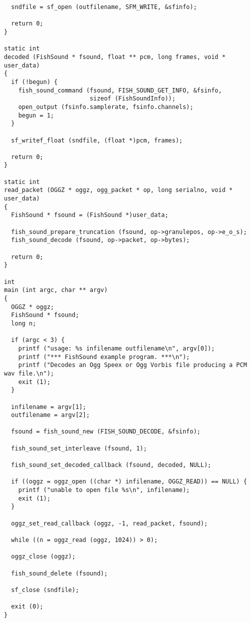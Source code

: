 \begin{verbatim}
  sndfile = sf_open (outfilename, SFM_WRITE, &sfinfo);

  return 0;
}

static int
decoded (FishSound * fsound, float ** pcm, long frames, void * user_data)
{
  if (!begun) {
    fish_sound_command (fsound, FISH_SOUND_GET_INFO, &fsinfo,
                        sizeof (FishSoundInfo));
    open_output (fsinfo.samplerate, fsinfo.channels);
    begun = 1;
  }

  sf_writef_float (sndfile, (float *)pcm, frames);

  return 0;
}

static int
read_packet (OGGZ * oggz, ogg_packet * op, long serialno, void * user_data)
{
  FishSound * fsound = (FishSound *)user_data;

  fish_sound_prepare_truncation (fsound, op->granulepos, op->e_o_s);
  fish_sound_decode (fsound, op->packet, op->bytes);

  return 0;
}

int
main (int argc, char ** argv)
{
  OGGZ * oggz;
  FishSound * fsound;
  long n;

  if (argc < 3) {
    printf ("usage: %s infilename outfilename\n", argv[0]);
    printf ("*** FishSound example program. ***\n");
    printf ("Decodes an Ogg Speex or Ogg Vorbis file producing a PCM wav file.\n");
    exit (1);
  }

  infilename = argv[1];
  outfilename = argv[2];

  fsound = fish_sound_new (FISH_SOUND_DECODE, &fsinfo);

  fish_sound_set_interleave (fsound, 1);

  fish_sound_set_decoded_callback (fsound, decoded, NULL);

  if ((oggz = oggz_open ((char *) infilename, OGGZ_READ)) == NULL) {
    printf ("unable to open file %s\n", infilename);
    exit (1);
  }

  oggz_set_read_callback (oggz, -1, read_packet, fsound);

  while ((n = oggz_read (oggz, 1024)) > 0);

  oggz_close (oggz);

  fish_sound_delete (fsound);
  
  sf_close (sndfile);

  exit (0);
}

\end{verbatim}
\normalsize
 